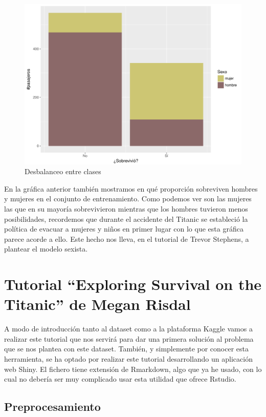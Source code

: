 \documentclass[10pt,a4paper]{article}
\begin{document}
\begin{figure}[H]
  \centering
  \includegraphics[width=\textwidth]{imgs/imbalanced}
  \caption{Desbalanceo entre clases}
\end{figure}

En la gráfica anterior también mostramos en qué proporción sobreviven hombres y mujeres en el conjunto de entrenamiento. Como podemos ver son las mujeres las que en su mayoría sobrevivieron mientras que los hombres tuvieron menos posibilidades, recordemos que durante el accidente del Titanic se estableció la política de evacuar a mujeres y niños en primer lugar con lo que esta gráfica parece acorde a ello. Este hecho nos lleva, en el tutorial de Trevor Stephens, a plantear el modelo sexista.
\appendix

\section{Tutorial ``Exploring Survival on the Titanic'' de Megan Risdal}

%

A modo de introducción tanto al dataset como a la plataforma Kaggle vamos a realizar este tutorial que nos servirá para dar una primera solución al problema que se nos plantea con este dataset. También, y simplemente por conocer esta herramienta, se ha optado por realizar este tutorial desarrollando un aplicación web Shiny. El fichero tiene extensión de Rmarkdown, algo que ya he usado, con lo cual no debería ser muy complicado usar esta utilidad que ofrece Rstudio.

\subsection{Preprocesamiento}
\end{document}
